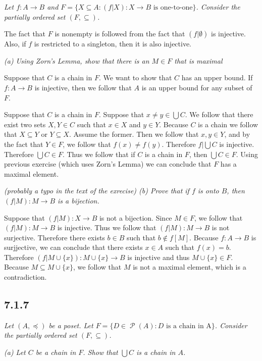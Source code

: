 \documentclass[11pt,oneside,titlepage]{book}
\DeclareMathOperator \pow {\mathcal {P}}
\newcommand{\set}[1]{\{ #1 \}}
\begin{document}
\textit{Let $f: A \to B$ and $F = \set{X \subseteq A: (f|X): X \to B \text{ is one-to-one}}$.
  Consider the  partially ordered set $(F, \subseteq)$.}

The fact that $F$ is nonempty is followed from the fact that $(f|\emptyset)$ is injective.
Also, if $f$ is restricted to a singleton, then it is also injective.

\textit{(a) Using Zorn's Lemma, show that there is an $M \in F$ that is maximal}

Suppose that $C$ is a chain in $F$. We want to show that $C$ has an upper bound.
If $f: A \to B$ is injective, then we follow that $A$ is an upper bound for any subset of $F$.

Suppose that $C$ is a chain in $F$. Suppose that $x \neq y \in \bigcup{C}$. We follow that
there exist two sets $X, Y \in C$ such that $x \in X$ and $y \in Y$. Because $C$ is a
chain we follow that $X \subseteq Y$ or $Y \subseteq X$. Assume the former. Then we follow that
$x, y \in Y$, and by the fact that $Y \in F$, we follow that $f(x) \neq f(y)$. Therefore
$f|\bigcup{C}$ is injective. Therefore $\bigcup{C} \in F$.
Thus we follow that if $C$ is a chain in $F$, then $\bigcup{C} \in F$. Using previous exercise
(which uses Zorn's Lemma) we can conclude that $F$ has a maximal element.

\textit{(probably a typo in the text of the exrecise)
  (b) Prove that if $f$ is onto $B$, then $(f|M): M \to B$ is a bijection.}

Suppose that $(f|M): X \to B$ is not a bijection. Since $M \in F$, we follow that
$(f|M): M \to B$ is injective. Thus we follow that $(f|M): M \to B$ is not surjective.
Therefore there exists $b \in B$ such that $b \notin f[M]$. Because $f: A \to B$ is
surjjective, we can conclude that there exists $x \in A$ such that $f(x) = b$. Therefore
$(f|M \cup \{x\}): M \cup \{x\} \to B$ is injective and thus $M \cup \{x\} \in F$.
Because $M \subseteq M \cup \{x\}$, we follow that $M$ is not a maximal element, which is
a contradiction.

\subsection*{7.1.7}

\textit{Let $(A, \preceq)$ be a poset. Let $F = \set{D \in \pow(A): D \text{ is a chain in A}}$.
  Consider the partially ordered set $(F, \subseteq)$.}

\textit{(a) Let $C$ be a chain in $F$. Show that $\bigcup{C}$ is a chain in $A$.}
\end{document}
